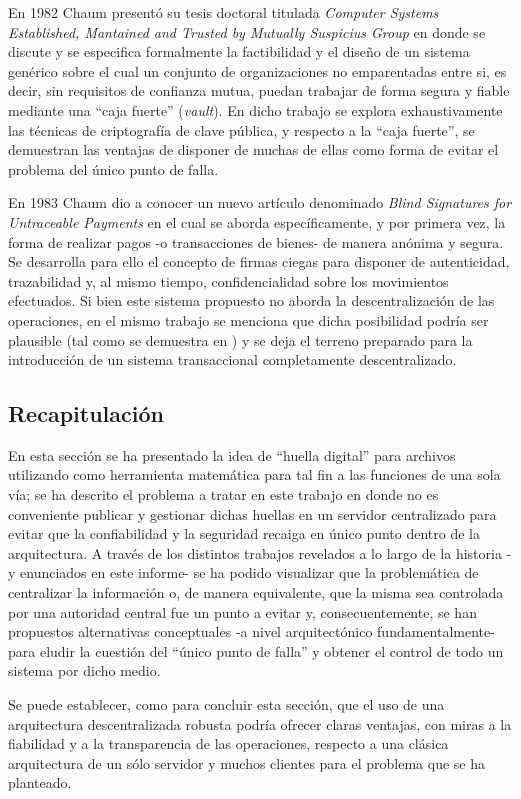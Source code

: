 En 1982 Chaum presentó su tesis doctoral titulada \textit{Computer Systems Established, Mantained and Trusted by Mutually Suspicius Group}\cite{Chaum1982} en donde se discute y se especifica formalmente la factibilidad y el diseño de un sistema genérico sobre el cual un conjunto de organizaciones no emparentadas entre si, es decir, sin requisitos de confianza mutua, puedan trabajar de forma segura y fiable mediante una ``caja fuerte'' (\textit{vault}). En dicho trabajo se explora exhaustivamente las técnicas de criptografía de clave pública, y respecto a la ``caja fuerte'', se demuestran las ventajas de disponer de muchas de ellas como forma de evitar el problema del único punto de falla.

En 1983 Chaum dio a conocer un nuevo artículo denominado \textit{Blind Signatures for Untraceable Payments}\cite{Chaum1983} en el cual se aborda específicamente, y por primera vez, la forma de realizar pagos -o transacciones de bienes- de manera anónima y segura. Se desarrolla para ello el concepto de firmas ciegas para disponer de autenticidad, trazabilidad y, al mismo tiempo, confidencialidad sobre los movimientos efectuados. Si bien este sistema propuesto no aborda la descentralización de las operaciones, en el mismo trabajo se menciona que dicha posibilidad podría ser plausible (tal como se demuestra en \cite{Chaum1982}) y se deja el terreno preparado para la introducción de un sistema transaccional completamente descentralizado.

\subsection{Recapitulación}
\label{recapitulacion_desc_problema}

En esta sección se ha presentado la idea de ``huella digital'' para archivos utilizando como herramienta matemática para tal fin a las funciones de una sola vía; se ha descrito el problema a tratar en este trabajo en donde no es conveniente publicar y gestionar dichas huellas en un servidor centralizado para evitar que la confiabilidad y la seguridad recaiga en único punto dentro de la arquitectura. A través de los distintos trabajos revelados a lo largo de la historia -y enunciados en este informe- se ha podido visualizar que la problemática de centralizar la información o, de manera equivalente, que la misma sea controlada por una autoridad central fue un punto a evitar y, consecuentemente, se han propuestos alternativas conceptuales -a nivel arquitectónico fundamentalmente- para eludir la cuestión del ``único punto de falla'' y obtener el control de todo un sistema por dicho medio.

Se puede establecer, como para concluir esta sección, que el uso de una arquitectura descentralizada robusta podría ofrecer claras ventajas, con miras a la fiabilidad y a la transparencia de las operaciones, respecto a una clásica arquitectura de un sólo servidor y muchos clientes para el problema que se ha planteado.
